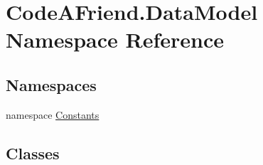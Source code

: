 \hypertarget{namespace_code_a_friend_1_1_data_model}{}\section{Code\+A\+Friend.\+Data\+Model Namespace Reference}
\label{namespace_code_a_friend_1_1_data_model}
\subsection*{Namespaces}
\begin{DoxyCompactItemize}
\item 
namespace \mbox{\hyperlink{namespace_code_a_friend_1_1_data_model_1_1_constants}{Constants}}
\end{DoxyCompactItemize}
\subsection*{Classes}
